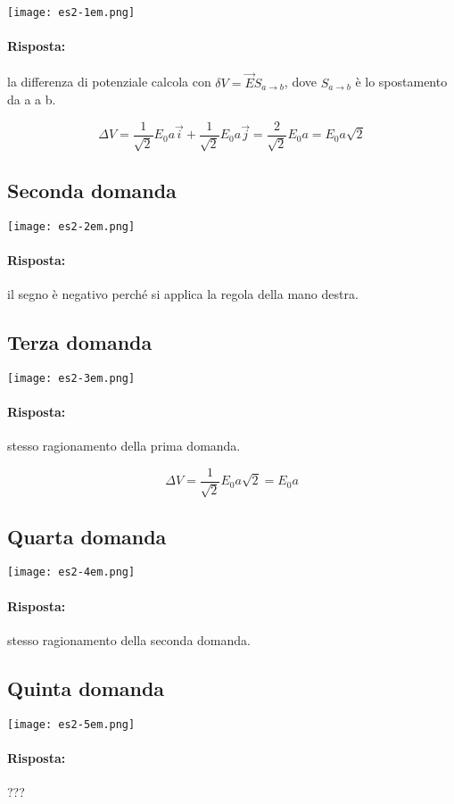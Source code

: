 \begin{center}
  \texttt{[image: es2-1em.png]}
\end{center}

\paragraph{Risposta:} la differenza di potenziale calcola con $\delta V = \vec{E} S_{a\rightarrow b}$, dove $S_{a \rightarrow b}$ è lo spostamento da a a b. 

$$\Delta V = \frac{1}{\sqrt{2}} E_0 a \vec{i} + \frac{1}{\sqrt{2}} E_0 a \vec{j} =  \frac{2}{\sqrt{2}} E_0 a = E_0 a \sqrt{2}$$

\subsection{Seconda domanda}

\begin{center}
  \texttt{[image: es2-2em.png]}
\end{center}

\paragraph{Risposta:} il segno è negativo perché si applica la regola della mano destra.

\subsection{Terza domanda}

\begin{center}
  \texttt{[image: es2-3em.png]}
\end{center}

\paragraph{Risposta:} stesso ragionamento della prima domanda.

$$\Delta V = \frac{1}{\sqrt{2}} E_0 a \sqrt{2} = E_0 a$$

\subsection{Quarta domanda}

\begin{center}
  \texttt{[image: es2-4em.png]}
\end{center}

\paragraph{Risposta:} stesso ragionamento della seconda domanda.

\subsection{Quinta domanda}

\begin{center}
  \texttt{[image: es2-5em.png]}
\end{center}

\paragraph{Risposta:} ???
